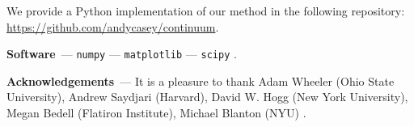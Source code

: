 \documentclass[modern]{aastex631}
\renewcommand{\paragraph}[1]{\medskip\par\noindent\textbf{#1}~---}
\begin{document}
\noindent{}We provide a Python implementation of our method in the following repository: \url{https://github.com/andycasey/continuum}. 

\paragraph{Software}
\texttt{numpy} \citep{numpy} ---
\texttt{matplotlib} \citep{matplotlib} ---
\texttt{scipy} \citep{scipy}.

\paragraph{Acknowledgements}
It is a pleasure to thank
    Adam Wheeler (Ohio State University),
    Andrew Saydjari (Harvard),
    David W. Hogg (New York University),
    Megan Bedell (Flatiron Institute),
    Michael Blanton (NYU)
.

%
\end{document}

